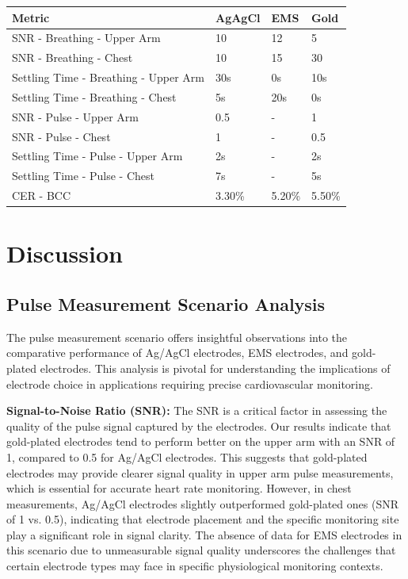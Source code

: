 \documentclass[conference]{IEEEtran}
\begin{document}
\begin{table}[!ht]
    \centering
    \begin{tabular}{|l|l|l|l|}
    \hline
        Metric & AgAgCl & EMS & Gold \\ \hline
        SNR - Breathing - Upper Arm & 10 & 12 & 5 \\ \hline
        SNR - Breathing - Chest & 10 & 15 & 30 \\ \hline
        Settling Time - Breathing - Upper Arm & 30s & 0s & 10s \\ \hline
        Settling Time - Breathing - Chest & 5s & 20s & 0s \\ \hline
        SNR - Pulse - Upper Arm & 0.5 & - & 1 \\ \hline
        SNR - Pulse - Chest & 1 & - & 0.5 \\ \hline
        Settling Time - Pulse - Upper Arm & 2s & - & 2s \\ \hline
        Settling Time - Pulse - Chest & 7s & - & 5s \\ \hline
        CER - BCC & 3.30\% & 5.20\% & 5.50\% \\ \hline
    \end{tabular}
\end{table}

\section{Discussion}

\subsection{Pulse Measurement Scenario Analysis}

The pulse measurement scenario offers insightful observations into the comparative performance of Ag/AgCl electrodes, EMS electrodes, and gold-plated electrodes. This analysis is pivotal for understanding the implications of electrode choice in applications requiring precise cardiovascular monitoring.

\textbf{Signal-to-Noise Ratio (SNR):} The SNR is a critical factor in assessing the quality of the pulse signal captured by the electrodes. Our results indicate that gold-plated electrodes tend to perform better on the upper arm with an SNR of 1, compared to 0.5 for Ag/AgCl electrodes. This suggests that gold-plated electrodes may provide clearer signal quality in upper arm pulse measurements, which is essential for accurate heart rate monitoring. However, in chest measurements, Ag/AgCl electrodes slightly outperformed gold-plated ones (SNR of 1 vs. 0.5), indicating that electrode placement and the specific monitoring site play a significant role in signal clarity. The absence of data for EMS electrodes in this scenario due to unmeasurable signal quality underscores the challenges that certain electrode types may face in specific physiological monitoring contexts.
\end{document}
